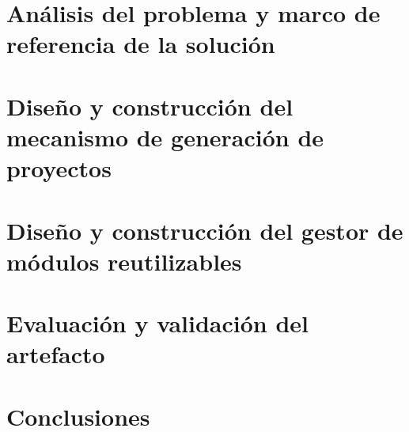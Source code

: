 \documentclass[11pt,twoside,openany]{thesis}
\begin{document}
\chapter{Análisis del problema y marco de referencia de la solución}



\chapter{Diseño y construcción del mecanismo de generación de proyectos}



\chapter{Diseño y construcción del gestor de módulos reutilizables}



\chapter{Evaluación y validación del artefacto}



\chapter{Conclusiones}





\end{document}
